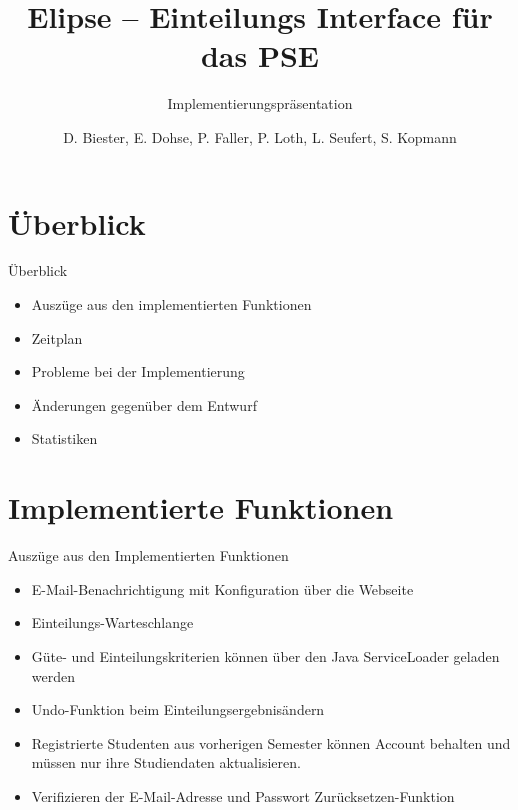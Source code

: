 \documentclass[18pt, xcolor=table]{beamer}
\title[Elipse]{Elipse -- Einteilungs Interface für das PSE}
\subtitle{Implementierungspräsentation}
\author{D. Biester, E. Dohse, P. Faller, P. Loth, L. Seufert, S. Kopmann}
\institute{IPD Snelting}
\begin{document}

\begin{frame}
\titlepage
\end{frame}
\section{Überblick}
\begin{frame}{Überblick}
\begin{itemize}
  \item Auszüge aus den implementierten Funktionen
  \item Zeitplan
  \item Probleme bei der Implementierung
  \item Änderungen gegenüber dem Entwurf
  \item Statistiken
\end{itemize}
\end{frame}

\section{Implementierte Funktionen}
\begin{frame}{Auszüge aus den Implementierten Funktionen}
\begin{itemize}
  \item E-Mail-Benachrichtigung mit Konfiguration über die Webseite
  \item Einteilungs-Warteschlange
  \item Güte- und Einteilungskriterien können über den Java ServiceLoader geladen werden
  \item Undo-Funktion beim Einteilungsergebnisändern
  \item Registrierte Studenten aus vorherigen Semester können Account behalten und müssen nur ihre Studiendaten aktualisieren.
  \item Verifizieren der E-Mail-Adresse und Passwort Zurücksetzen-Funktion
\end{itemize}
\end{frame}
\end{document}
